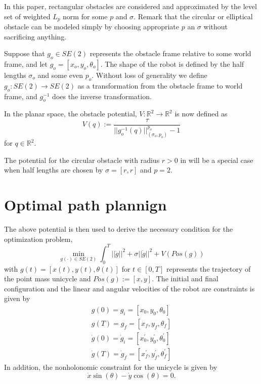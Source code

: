 \documentclass[letterpaper, 11 pt, onecolumn]{ieeeconf}  %
\theoremstyle{definition}
\newcommand{\halfL}{\sigma}
\begin{document}
In this paper, rectangular obstacles are considered and approximated by the level set of weighted $L_p$ norm for some $p$ and $\halfL$. Remark that the circular or elliptical obstacle can be modeled simply by choosing appropriate $p$ an $\halfL$ without sacrificing anything. 

Suppose that $g_o\in SE(2)$ represents the obstacle frame relative to some world frame, and let $g_o= [x_o, y_o, \theta_o]$. The shape of the robot is defined by the half lengths $\halfL_o$ and some even $p_o$. Without loss of generality we define $g_o:SE(2)\to SE(2)$ as a transformation from the obstacle frame to world frame, and $g_o^{-1}$ does the inverse transformation. 

In the planar space, the obstacle potential, $V:\mathbb{R}^2\to\mathbb{R}^2$ is now defined as 
\begin{equation}
V(q):=\frac{\tau}{||g_o^{-1}(q)||_{(\halfL_o,p_o)}^{p_o}-1}
\end{equation} 
for $q\in\mathbb{R}^2$.

The potential for the circular obstacle with radius $r>0$ in \cite{Colombo2017cdc} will be a special case when half lengths are chosen by $\halfL=[r,r]$ and $p=2$. 

\section{Optimal path plannign} 
The above potential is then used to derive the necessary condition for the optimization problem,
\begin{equation}
\min_{g(\cdot)\in SE(2)} \int_{0}^T ||\ddot{g}||^2+\sigma||\dot{g}||^2+V(Pos(g))
\end{equation}
with $g(t)=[x(t), y(t), \theta(t)]$ for $t\in [0,T]$ represents the trajectory of the point mass unicycle and $Pos(g):=[x,y]$. The initial and final configuration and the linear and angular velocities of the robot  are constraints is given by 
\begin{eqnarray}
\label{eqn:bv_initial_config}
g(0)=g_i=[x_0, y_0, \theta_0]
\\
\label{eqn:bv_final_config}
g(T)=g_f=[x_f, y_f, \theta_f]
\\
\label{eqn:bv_initial_speed}
\dot{g}(0)=\dot{g}_i=[x^\prime_0, y^\prime_0, \theta^\prime_0]
\\
\label{eqn:bv_final_speed}
\dot{g}(T)=\dot{g}_f=[x^\prime_f, y^\prime_f, \theta^\prime_f]
\end{eqnarray} 
In addition, the nonholonomic constraint for the unicycle is given by
\begin{equation}
\label{eqn:nonholonomic}
\dot{x}\sin(\theta)-\dot{y}\cos(\theta)=0.
\end{equation}
\end{document}
